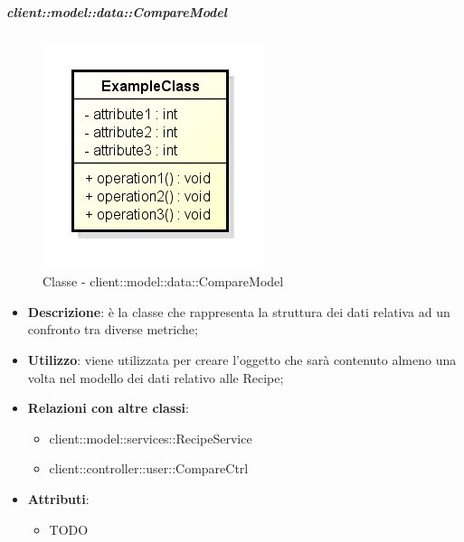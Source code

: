 		\subparagraph{client::model::data::CompareModel} %
		\label{subp:client_model_data_comparemodel}
			\begin{figure}[htbp]
				\centering
				\centerline{\includegraphics[scale=0.7]{./images/client/classes/example_class.png}}
				\caption{Classe - client::model::data::CompareModel}
			\end{figure}
			\begin{itemize}
				\item \textbf{Descrizione}: è la classe che rappresenta la struttura dei dati relativa ad un confronto tra diverse metriche;
				\item \textbf{Utilizzo}: viene utilizzata per creare l'oggetto che sarà contenuto almeno una volta nel modello dei dati relativo alle Recipe;
				\item \textbf{Relazioni con altre classi}:
					\begin{itemize}
						\item client::model::services::RecipeService
						\item client::controller::user::CompareCtrl
					\end{itemize}
				\item \textbf{Attributi}:
					\begin{itemize}
						\item TODO
					\end{itemize}
			\end{itemize}

